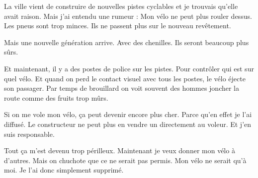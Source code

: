 La ville vient de construire de nouvelles pistes cyclables et je trouvais qu'elle avait raison. Mais j'ai entendu une rumeur : Mon vélo ne peut plus rouler dessus. Les pneus sont trop minces. Ils ne passent plus sur le nouveau revêtement.

Mais une nouvelle génération arrive. Avec des chenilles. Ils seront beaucoup plus sûrs.

Et maintenant, il y a des postes de police sur les pistes. Pour contrôler qui est sur quel vélo. Et quand on perd le contact visuel avec tous les postes, le vélo éjecte son passager. Par temps de brouillard on voit souvent des hommes joncher la route comme des fruits trop mûrs.

Si on me vole mon vélo, ça peut devenir encore plus cher. Parce qu'en effet je l'ai diffusé. Le constructeur ne peut plus en vendre un directement au voleur. Et j'en suis responsable.

Tout ça m'est devenu trop périlleux. Maintenant je veux donner mon vélo à d'autres. Mais on chuchote que ce ne serait pas permis. Mon vélo ne serait qu'à moi. Je l'ai donc simplement supprimé.